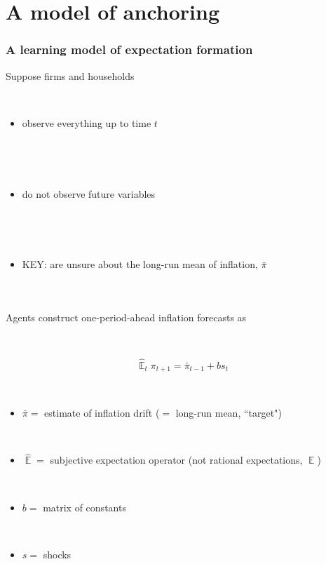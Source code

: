 \documentclass{beamer}
\DeclareMathOperator{\E}{\mathbb{E}}
\begin{document}
\section{A model of anchoring}
\begin{frame}
	\frametitle{A learning model of expectation formation}
Suppose firms and households

\

\begin{itemize}
\item observe everything up to time $t$ 

\

\

\item do not observe future variables

\

\

\item KEY: are unsure about the long-run mean of inflation, $\bar{\pi}$
\end{itemize}


\



\end{frame}

\begin{frame}
	\frametitle{}

Agents construct one-period-ahead inflation forecasts as

\

\begin{equation}
\hat{\E}_{t}\pi_{t+1} =  \bar{\pi}_{t-1}+bs_{t} \label{PLM}
\end{equation}

\

\begin{itemize}
\item[] $\bar{\pi} =$ estimate of inflation drift ($=$ long-run mean, ``target")

\



\item[] $\hat{\E} =$ subjective expectation operator (not rational expectations, $\E$)

\



\item[] $b =$ matrix of constants 

\

\item[] $s =$ shocks
\end{itemize}

\



\end{frame}
\end{document}
